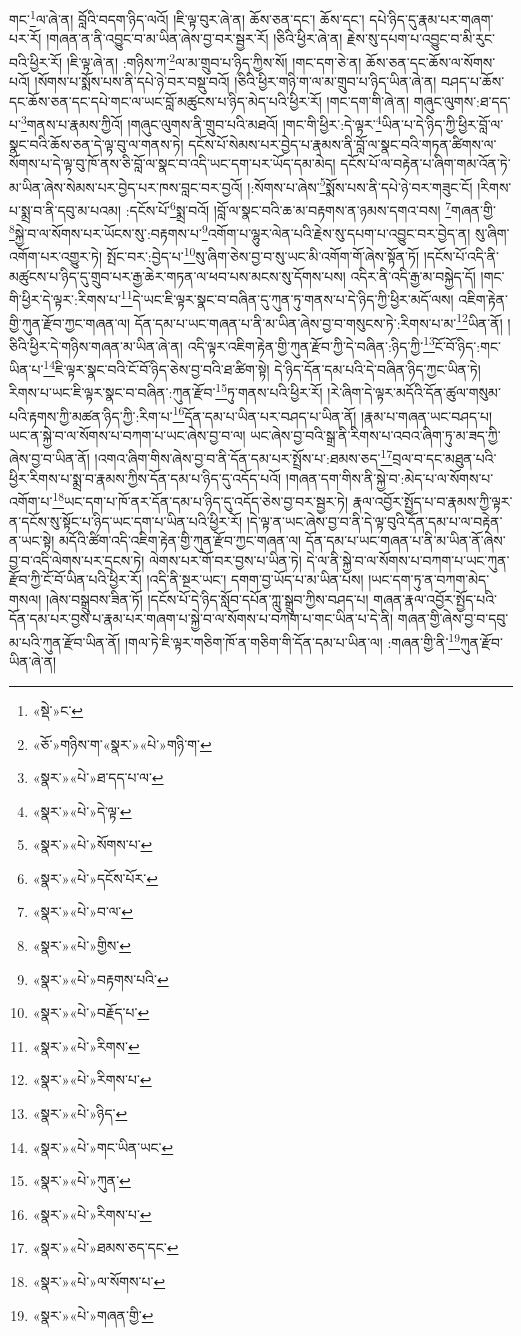 གང་\footnote{«སྡེ་»ང་}ལ་ཞེ་ན། བློའི་བདག་ཉིད་ལའོ། །ཇི་ལྟ་བུར་ཞེ་ན། ཆོས་ཅན་དང་། ཆོས་དང་། དཔེ་ཉིད་དུ་རྣམ་པར་གཞག་པར་རོ། །གཞན་ན་ནི་འབྱུང་བ་མ་ཡིན་ཞེས་བྱ་བར་སྦྱར་རོ། །ཅིའི་ཕྱིར་ཞེ་ན། རྗེས་སུ་དཔག་པ་འབྱུང་བ་མི་རུང་བའི་ཕྱིར་རོ། །ཇི་ལྟ་ཞེ་ན། :གཉིས་ཀ་\footnote{«ཅོ་»གཉིས་ག་«སྣར་»«པེ་»གཉི་ག་}ལ་མ་གྲུབ་པ་ཉིད་ཀྱིས་སོ། །གང་དག་ཅེ་ན། ཆོས་ཅན་དང་ཆོས་ལ་སོགས་པའོ། །སོགས་པ་སྨོས་པས་ནི་དཔེ་ཉེ་བར་བསྡུ་བའོ། །ཅིའི་ཕྱིར་གཉི་ག་ལ་མ་གྲུབ་པ་ཉིད་ཡིན་ཞེ་ན། བཤད་པ་ཆོས་དང་ཆོས་ཅན་དང་དཔེ་གང་ལ་ཡང་བློ་མཚུངས་པ་ཉིད་མེད་པའི་ཕྱིར་རོ། །གང་དག་གི་ཞེ་ན། གཞུང་ལུགས་:ཐ་དད་པ་\footnote{«སྣར་»«པེ་»ཐ་དད་པ་ལ་}གནས་པ་རྣམས་ཀྱིའོ། །གཞུང་ལུགས་ནི་གྲུབ་པའི་མཐའོ། །གང་གི་ཕྱིར་:དེ་ལྟར་\footnote{«སྣར་»«པེ་»དེ་ལྟ་}ཡིན་པ་དེ་ཉིད་ཀྱི་ཕྱིར་བློ་ལ་སྣང་བའི་ཆོས་ཅན་དེ་ལྟ་བུ་ལ་གནས་ཏེ། དངོས་པོ་སེམས་པར་བྱེད་པ་རྣམས་ནི་བློ་ལ་སྣང་བའི་གཏན་ཚིགས་ལ་སོགས་པ་དེ་ལྟ་བུ་ཁོ་ནས་ཅི་བློ་ལ་སྣང་བ་འདི་ཡང་དག་པར་ཡོད་དམ་མེད། དངོས་པོ་ལ་བརྟེན་པ་ཞིག་གམ་འོན་ཏེ་མ་ཡིན་ཞེས་སེམས་པར་བྱེད་པར་ཁས་བླང་བར་བྱའོ། །:སོགས་པ་ཞེས་\footnote{«སྣར་»«པེ་»སོགས་པ་}སྨོས་པས་ནི་དཔེ་ཉེ་བར་གཟུང་ངོ། །རིགས་པ་སྨྲ་བ་ནི་དབུ་མ་པའམ། :དངོས་པོ་\footnote{«སྣར་»«པེ་»དངོས་པོར་}སྨྲ་བའོ། །བློ་ལ་སྣང་བའི་ཆ་མ་བརྟགས་ན་ཉམས་དགའ་བས། \footnote{«སྣར་»«པེ་»བ་ལ་}གཞན་གྱི་\footnote{«སྣར་»«པེ་»གྱིས་}སྐྱེ་བ་ལ་སོགས་པར་ཡོངས་སུ་:བརྟགས་པ་\footnote{«སྣར་»«པེ་»བརྟགས་པའི་}འགོག་པ་ལྷུར་ལེན་པའི་རྗེས་སུ་དཔག་པ་འབྱུང་བར་བྱེད་ན། སུ་ཞིག་འགོག་པར་འགྱུར་ཏེ། སྤོང་བར་:བྱེད་པ་\footnote{«སྣར་»«པེ་»བརྗོད་པ་}སུ་ཞིག་ཅེས་བྱ་བ་སུ་ཡང་མི་འགོག་གོ་ཞེས་སྟོན་ཏོ། །དངོས་པོ་འདི་ནི་མཚུངས་པ་ཉིད་དུ་གྲུབ་པར་རྒྱ་ཆེར་གཏན་ལ་ཕབ་པས་མངས་སུ་དོགས་པས། འདིར་ནི་འདི་རྒྱ་མ་བསྐྱེད་དོ། །གང་གི་ཕྱིར་དེ་ལྟར་:རིགས་པ་\footnote{«སྣར་»«པེ་»རིགས་}དེ་ཡང་ཇི་ལྟར་སྣང་བ་བཞིན་དུ་ཀུན་ཏུ་གནས་པ་དེ་ཉིད་ཀྱི་ཕྱིར་མདོ་ལས། འཇིག་རྟེན་གྱི་ཀུན་རྫོབ་ཀྱང་གཞན་ལ། དོན་དམ་པ་ཡང་གཞན་པ་ནི་མ་ཡིན་ཞེས་བྱ་བ་གསུངས་ཏེ་:རིགས་པ་མ་\footnote{«སྣར་»«པེ་»རིགས་པ་}ཡིན་ནོ། །ཅིའི་ཕྱིར་དེ་གཉིས་གཞན་མ་ཡིན་ཞེ་ན། འདི་ལྟར་འཇིག་རྟེན་གྱི་ཀུན་རྫོབ་ཀྱི་དེ་བཞིན་:ཉིད་ཀྱི་\footnote{«སྣར་»«པེ་»ཉིད་}ངོ་བོ་ཉིད་:གང་ཡིན་པ་\footnote{«སྣར་»«པེ་»གང་ཡིན་ཡང་}ཇི་ལྟར་སྣང་བའི་ངོ་བོ་ཉིད་ཅེས་བྱ་བའི་ཐ་ཚིག་སྟེ། དེ་ཉིད་དོན་དམ་པའི་དེ་བཞིན་ཉིད་ཀྱང་ཡིན་ཏེ། རིགས་པ་ཡང་ཇི་ལྟར་སྣང་བ་བཞིན་:ཀུན་རྫོབ་\footnote{«སྣར་»«པེ་»ཀུན་}ཏུ་གནས་པའི་ཕྱིར་རོ། །རེ་ཞིག་དེ་ལྟར་མདོའི་དོན་ཚུལ་གསུམ་པའི་རྟགས་ཀྱི་མཚན་ཉིད་ཀྱི་:རིག་པ་\footnote{«སྣར་»«པེ་»རིགས་པ་}དོན་དམ་པ་ཡིན་པར་བཤད་པ་ཡིན་ནོ། །རྣམ་པ་གཞན་ཡང་བཤད་པ། ཡང་ན་སྐྱེ་བ་ལ་སོགས་པ་བཀག་པ་ཡང་ཞེས་བྱ་བ་ལ། ཡང་ཞེས་བྱ་བའི་སྒྲ་ནི་རིགས་པ་འབའ་ཞིག་ཏུ་མ་ཟད་ཀྱི་ཞེས་བྱ་བ་ཡིན་ནོ། །འགའ་ཞིག་གིས་ཞེས་བྱ་བ་ནི་དོན་དམ་པར་སྤྲོས་པ་:ཐམས་ཅད་\footnote{«སྣར་»«པེ་»ཐམས་ཅད་དང་}བྲལ་བ་དང་མཐུན་པའི་ཕྱིར་རིགས་པ་སྨྲ་བ་རྣམས་ཀྱིས་དོན་དམ་པ་ཉིད་དུ་འདོད་པའོ། །གཞན་དག་གིས་ནི་སྐྱེ་བ་:མེད་པ་ལ་སོགས་པ་འགོག་པ་\footnote{«སྣར་»«པེ་»ལ་སོགས་པ་}ཡང་དག་པ་ཁོ་ནར་དོན་དམ་པ་ཉིད་དུ་འདོད་ཅེས་བྱ་བར་སྦྱར་ཏེ། རྣལ་འབྱོར་སྤྱོད་པ་བ་རྣམས་ཀྱི་ལྟར་ན་དངོས་སུ་སྟོང་པ་ཉིད་ཡང་དག་པ་ཡིན་པའི་ཕྱིར་རོ། །དེ་ལྟ་ན་ཡང་ཞེས་བྱ་བ་ནི་དེ་ལྟ་བུའི་དོན་དམ་པ་ལ་བརྟེན་ན་ཡང་སྟེ། མདོའི་ཚིག་འདི་འཇིག་རྟེན་གྱི་ཀུན་རྫོབ་ཀྱང་གཞན་ལ། དོན་དམ་པ་ཡང་གཞན་པ་ནི་མ་ཡིན་ནོ་ཞེས་བྱ་བ་འདི་ལེགས་པར་དྲངས་ཏེ། ལེགས་པར་གོ་བར་བྱས་པ་ཡིན་ཏེ། དེ་ལ་ནི་སྐྱེ་བ་ལ་སོགས་པ་བཀག་པ་ཡང་ཀུན་རྫོབ་ཀྱི་ངོ་བོ་ཡིན་པའི་ཕྱིར་རོ། །འདི་ནི་སྔར་ཡང་། དགག་བྱ་ཡོད་པ་མ་ཡིན་པས། །ཡང་དག་ཏུ་ན་བཀག་མེད་གསལ། །ཞེས་བསྒྲུབས་ཟིན་ཏོ། །དངོས་པོ་དེ་ཉིད་སློབ་དཔོན་ཀླུ་སྒྲུབ་ཀྱིས་བཤད་པ། གཞན་རྣལ་འབྱོར་སྤྱོད་པའི་དོན་དམ་པར་བྱས་པ་རྣམ་པར་གཞག་པ་སྐྱེ་བ་ལ་སོགས་པ་བཀག་པ་གང་ཡིན་པ་དེ་ནི། གཞན་གྱི་ཞེས་བྱ་བ་དབུ་མ་པའི་ཀུན་རྫོབ་ཡིན་ནོ། །གལ་ཏེ་ཇི་ལྟར་གཅིག་ཁོ་ན་གཅིག་གི་དོན་དམ་པ་ཡིན་ལ། :གཞན་གྱི་ནི་\footnote{«སྣར་»«པེ་»གཞན་གྱི་}ཀུན་རྫོབ་ཡིན་ཞེ་ན། 